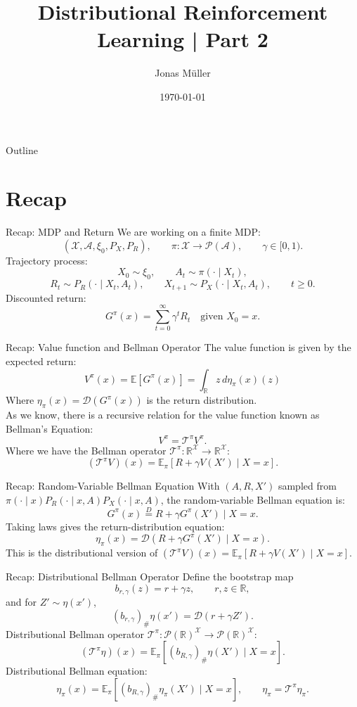 \documentclass[10pt]{beamer}
\title[Distributional RL]{Distributional Reinforcement Learning | Part 2}
\author[Jonas Müller]{Jonas Müller}
\date{\today}
\newcommand{\R}{\mathbb{R}}
\newcommand{\E}{\mathbb{E}}
\newcommand{\Pcal}{\mathcal{P}}
\newcommand{\X}{\mathcal{X}}
\newcommand{\A}{\mathcal{A}}
\newcommand{\T}{\mathcal{T}}
\newcommand{\D}{\mathcal{D}}
\newcommand{\1}{\mathds{1}}
\begin{document}
\begin{frame}
  \titlepage
\end{frame}

\begin{frame}{Outline}
  \tableofcontents
\end{frame}

\section{Recap}

\begin{frame}{Recap: MDP and Return}
  We are working on a finite MDP: 
  \[
    (\X,\A,\xi_0,P_X,P_R),
    \qquad
    \pi:\X\to\Pcal(\A),
    \qquad
    \gamma\in[0,1).
  \]
  Trajectory process:
  \[
    X_0\sim\xi_0,\qquad
    A_t\sim\pi(\cdot\mid X_t),
  \]
  \[
    R_t\sim P_R(\cdot\mid X_t,A_t),
    \qquad
    X_{t+1}\sim P_X(\cdot\mid X_t,A_t),
    \qquad t\geq0.
  \]
  Discounted return:
  \[
    G^\pi(x)
    =
    \sum_{t=0}^{\infty}\gamma^t R_t
    \quad\text{given }X_0=x.
  \]
\end{frame}

\begin{frame}{Recap: Value function and Bellman Operator}
  The value function is given by the expected return: 
  \[
    V^\pi(x)=\E[G^\pi(x)] = \int_\R z\,d\eta_\pi(x)(z)
  \]
  Where $\eta_\pi(x) = \D(G^\pi(x))$ is the return distribution. \\

  As we know, there is a recursive relation for the value function known as Bellman's Equation: 
  \[
    V^\pi=\T^\pi V^\pi.
  \]
  Where we have the Bellman operator $\T^\pi:\R^\X\to\R^\X$:
  \[
    (\T^\pi V)(x)
    =
    \E_\pi\left[
      R+\gamma V(X')
      \mid X=x
    \right].
  \]

\end{frame}

\begin{frame}{Recap: Random-Variable Bellman Equation}
  With $(A,R,X')$ sampled from
  $\pi(\cdot\mid x)P_R(\cdot\mid x,A)P_X(\cdot\mid x,A)$,
  the random-variable Bellman equation is:
  \[
    G^\pi(x)
    \overset{D}{=}
    R+\gamma G^\pi(X')
    \mid X=x.
  \]
  Taking laws gives the return-distribution equation:
  \[
    \eta_\pi(x)
    =
    \D\left(R+\gamma G^\pi(X')\mid X=x\right).
  \]
  This is the distributional version of
  $(\T^\pi V)(x)=\E_\pi[R+\gamma V(X')\mid X=x]$.
\end{frame}

\begin{frame}{Recap: Distributional Bellman Operator}
  Define the bootstrap map
  \[
    b_{r,\gamma}(z)=r+\gamma z,
    \qquad r,z\in\R,
  \]
  and for $Z'\sim\eta(x')$,
  \[
    (b_{r,\gamma})_\#\eta(x')=\D(r+\gamma Z').
  \]
  Distributional Bellman operator $\T^\pi:\Pcal(\R)^\X\to\Pcal(\R)^\X$:
  \[
    (\T^\pi\eta)(x)
    =
    \E_\pi\left[
      (b_{R,\gamma})_\#\eta(X')
      \mid X=x
    \right].
  \]
  Distributional Bellman equation:
  \[
    \eta_\pi(x)
    =
    \E_\pi\left[
      (b_{R,\gamma})_\#\eta_\pi(X')
      \mid X=x
    \right],
    \qquad
    \eta_\pi=\T^\pi\eta_\pi.
  \]
\end{frame}
\end{document}
